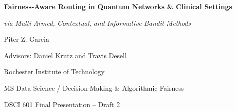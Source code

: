 \begin{frame}
\centering
\vspace{0.6cm}
{\Large\bfseries Fairness-Aware Routing in Quantum Networks \& Clinical Settings}\par
\vspace{0.25cm}
{\large\itshape via Multi-Armed, Contextual, and Informative Bandit Methods}\par
\vspace{0.55cm}
{\normalsize Piter Z. Garcia}\par
\vspace{0.15cm}
{\small Advisors: Daniel Krutz and Travis Desell}\par
\vspace{0.35cm}
{\small Rochester Institute of Technology}\par
{\small MS Data Science / Decision-Making \& Algorithmic Fairness}\par
\vspace{0.45cm}
{\small DSCI 601 Final Presentation -- Draft 2}
\end{frame}
